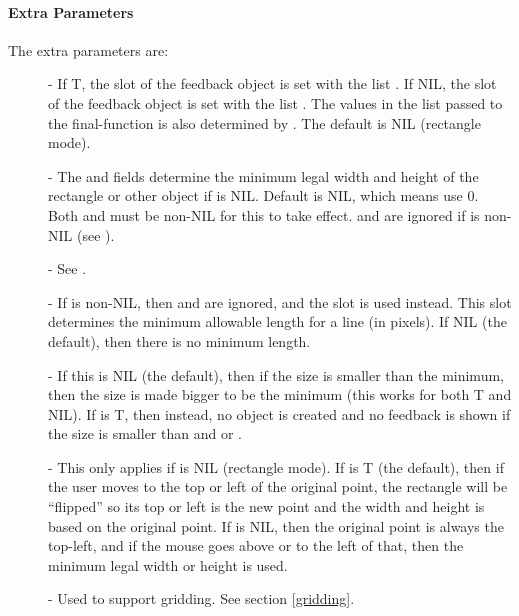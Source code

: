 \paragraph{Extra Parameters}

The extra parameters are:
\begin{description}
\item[] 
- If T, the  slot of the feedback object is set with the list
.  If NIL, the  slot of the feedback object is
set with the list .  The values in the list passed to the
final-function is also determined by .
The default is NIL (rectangle mode).

\item[] 
- The  and  fields determine the minimum
legal width and height of the rectangle or other object if  is NIL.
Default is NIL, which means use 0.  Both
 and 
must be non-NIL for this to take effect.   and
 are ignored if  is non-{\sc NIL} (see ).

\item[] 
- See .

\item[] 
- If  is non-{\sc NIL}, then  and
 are ignored, and the  slot is used
instead.  This slot determines the minimum allowable length for a line (in
pixels).  If NIL (the default), then there is no minimum length.

\item[] 
- If this is NIL (the default), then if the size is smaller than the
minimum, then the size is made bigger to be the minimum (this works for
both  T and NIL).  If
 is T, then instead, no object is created and no
feedback is shown if the size is smaller than  and
 or .

\item[] 
- This only applies if  is NIL (rectangle mode).
If  is T (the default), then if the user moves to
the top or left of the original point, the rectangle will be ``flipped'' so
its top or left is the new point and the width and height is based on the
original point.  If  is NIL, then the original
point is always the top-left, and if the mouse goes above or to the left of
that, then the minimum legal width or height is used.

\item[] 
- Used to support gridding.  See section \ref{gridding}.
\end{description}

